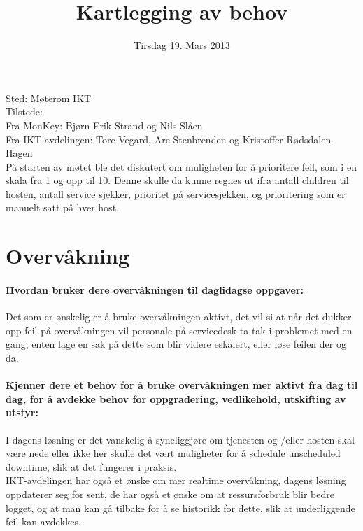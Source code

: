 


\title{Kartlegging av behov}
\date{Tirsdag 19. Mars 2013}


\maketitle
\noindent Sted: Møterom IKT \\
\noindent Tilstede: \\
\indent Fra MonKey: Bjørn-Erik Strand og Nils Slåen \\
\indent Fra IKT-avdelingen: Tore Vegard, Are Stenbrenden og Kristoffer Rødsdalen Hagen \\


\noindent På starten av møtet ble det diskutert om muligheten for å prioritere feil, som i en skala fra 1 og opp til 10. Denne skulle da kunne regnes ut ifra antall children til hosten, antall service sjekker, prioritet på servicesjekken, og prioritering som er manuelt satt på hver host.
\section{Overvåkning}
\paragraph{Hvordan bruker dere overvåkningen til daglidagse oppgaver:}
Det som er ønskelig er å bruke overvåkningen aktivt, det vil si at når det dukker opp feil på overvåkningen vil personale på servicedesk ta tak i problemet med en gang, enten lage en sak på dette som blir videre eskalert, eller løse feilen der og da.

\paragraph{Kjenner dere et behov for å bruke overvåkningen mer aktivt fra dag til dag, for å avdekke behov for oppgradering, vedlikehold, utskifting av utstyr:}
I dagens løsning er det vanskelig å syneliggjøre om tjenesten og /eller hosten skal være nede eller ikke her skulle det vært muligheter for å schedule unscheduled downtime, slik at det fungerer i praksis.\\

\noindent IKT-avdelingen har også et ønske om mer realtime overvåkning, dagens løsning oppdaterer seg for sent, de har også et ønske om at ressursforbruk blir bedre logget, og at man kan gå tilbake for å se historikk for dette, slik at underliggende feil kan avdekkes.
